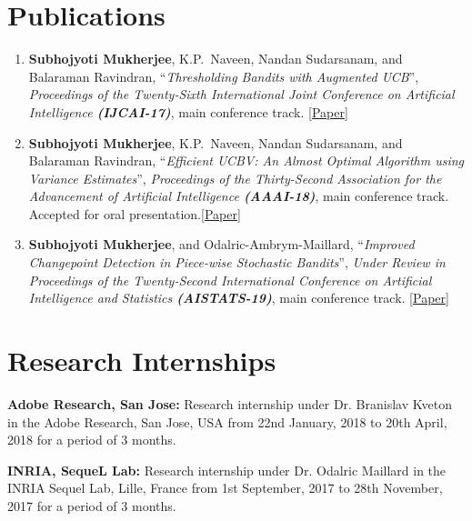 \documentclass[margin,11pt]{res}
\begin{document}
\begin{resume}
\section{Publications}
\begin{enumerate}[leftmargin=*]
\item \textbf{Subhojyoti Mukherjee}, K.P.~Naveen, Nandan Sudarsanam, and Balaraman Ravindran, ``\textit{Thresholding Bandits with Augmented UCB}'', \textit{Proceedings of the Twenty-Sixth International Joint Conference on Artificial Intelligence \textbf{(IJCAI-17)}}, main conference track. \href{https://www.ijcai.org/proceedings/2017/0350.pdf}{[Paper]}
\item \textbf{Subhojyoti Mukherjee}, K.P.~Naveen, Nandan Sudarsanam, and Balaraman Ravindran, ``\textit{Efficient UCBV: An Almost Optimal Algorithm using Variance Estimates}'', \textit{Proceedings of the Thirty-Second Association for the Advancement of Artificial Intelligence \textbf{(AAAI-18)}}, main conference track. Accepted for oral presentation.\href{https://www.aaai.org/ocs/index.php/AAAI/AAAI18/paper/view/16111}{[Paper]}
\item \textbf{Subhojyoti Mukherjee}, and Odalric-Ambrym-Maillard, ``\textit{Improved Changepoint Detection in Piece-wise Stochastic Bandits}'', \textit{Under Review in Proceedings of the Twenty-Second International  Conference on Artificial Intelligence and Statistics  \textbf{(AISTATS-19)}}, main conference track. \href{https://subhojyoti.github.io/pdf/aistats_2019.pdf}{[Paper]}
\end{enumerate}


\section{Research Internships}
\textbf{Adobe Research, San Jose:} Research internship under Dr. Branislav Kveton in the Adobe Research, San Jose, USA from 22nd January, 2018 to 20th April, 2018 for a period of 3 months.

\textbf{INRIA, SequeL Lab:} Research internship under Dr. Odalric Maillard in the INRIA Sequel Lab, Lille, France from 1st September, 2017 to 28th November, 2017 for a period of 3 months.



\end{resume}
\end{document}

